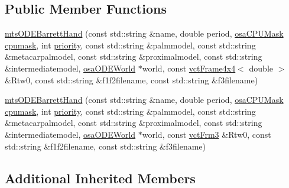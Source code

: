 \subsection*{Public Member Functions}
\begin{DoxyCompactItemize}
\item 
\hyperlink{classmts_o_d_e_barrett_hand_ae6f124bb20f84c8e6f2d045351cf78dd}{mts\-O\-D\-E\-Barrett\-Hand} (const std\-::string \&name, double period, \hyperlink{osa_c_p_u_affinity_8h_aaec7cdd7797e5e6eb5438c15fee5477a}{osa\-C\-P\-U\-Mask} \hyperlink{classmts_o_d_e_manipulator_task_aaff55dbeff38e947707c6b3405041622}{cpumask}, int \hyperlink{classmts_o_d_e_manipulator_task_ae2b16e466e4d216b2cf13ae89414696a}{priority}, const std\-::string \&palmmodel, const std\-::string \&metacarpalmodel, const std\-::string \&proximalmodel, const std\-::string \&intermediatemodel, \hyperlink{classosa_o_d_e_world}{osa\-O\-D\-E\-World} $\ast$world, const \hyperlink{classvct_frame4x4}{vct\-Frame4x4}$<$ double $>$ \&Rtw0, const std\-::string \&f1f2filename, const std\-::string \&f3filename)
\item 
\hyperlink{classmts_o_d_e_barrett_hand_ae6c8889a3762267377bfd05ae7c4a011}{mts\-O\-D\-E\-Barrett\-Hand} (const std\-::string \&name, double period, \hyperlink{osa_c_p_u_affinity_8h_aaec7cdd7797e5e6eb5438c15fee5477a}{osa\-C\-P\-U\-Mask} \hyperlink{classmts_o_d_e_manipulator_task_aaff55dbeff38e947707c6b3405041622}{cpumask}, int \hyperlink{classmts_o_d_e_manipulator_task_ae2b16e466e4d216b2cf13ae89414696a}{priority}, const std\-::string \&palmmodel, const std\-::string \&metacarpalmodel, const std\-::string \&proximalmodel, const std\-::string \&intermediatemodel, \hyperlink{classosa_o_d_e_world}{osa\-O\-D\-E\-World} $\ast$world, const \hyperlink{vct_transformation_types_8h_a81feda0a02c2d1bc26e5553f409fed20}{vct\-Frm3} \&Rtw0, const std\-::string \&f1f2filename, const std\-::string \&f3filename)
\end{DoxyCompactItemize}
\subsection*{Additional Inherited Members}


